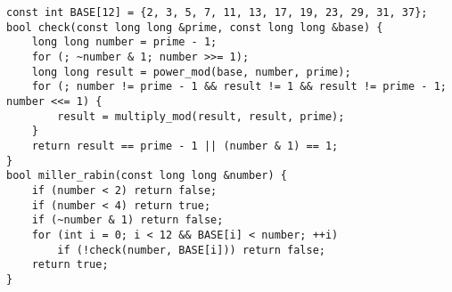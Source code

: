 \begin{lstlisting}
const int BASE[12] = {2, 3, 5, 7, 11, 13, 17, 19, 23, 29, 31, 37};
bool check(const long long &prime, const long long &base) {
    long long number = prime - 1;
    for (; ~number & 1; number >>= 1);
    long long result = power_mod(base, number, prime);
    for (; number != prime - 1 && result != 1 && result != prime - 1; number <<= 1) {
        result = multiply_mod(result, result, prime);
    }
    return result == prime - 1 || (number & 1) == 1;
}
bool miller_rabin(const long long &number) {
    if (number < 2) return false;
    if (number < 4) return true;
    if (~number & 1) return false;
    for (int i = 0; i < 12 && BASE[i] < number; ++i)
        if (!check(number, BASE[i])) return false;
    return true;
}
\end{lstlisting}
